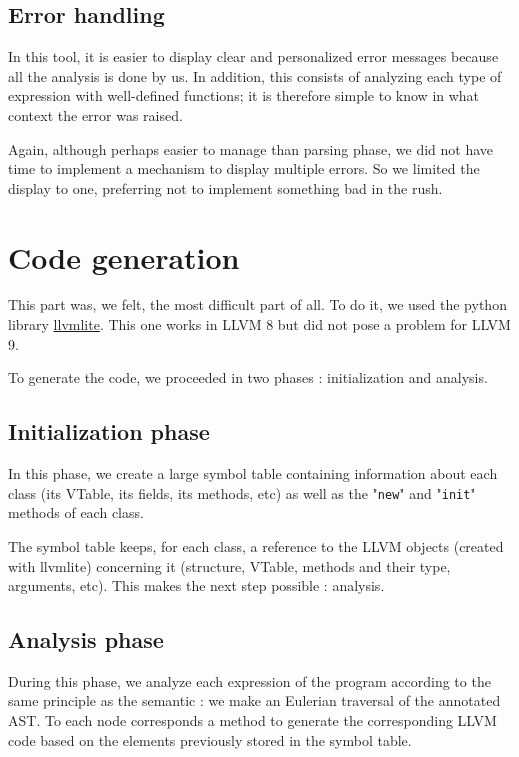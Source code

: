 \documentclass[a4paper, 12pt]{article}
\begin{document}
    \subsection{Error handling}
    
    In this tool, it is easier to display clear and personalized error messages because all the analysis is done by us. In addition, this consists of analyzing each type of expression with well-defined functions; it is therefore simple to know in what context the error was raised.
    
    Again, although perhaps easier to manage than parsing phase, we did not have time to implement a mechanism to display multiple errors. So we limited the display to one, preferring not to implement something bad in the rush.
    
    
    \section{Code generation}
    
    This part was, we felt, the most difficult part of all. To do it, we used the python library \href{https://github.com/numba/llvmlite}{llvmlite}. This one works in LLVM 8 but did not pose a problem for LLVM 9.
    
    To generate the code, we proceeded in two phases : initialization and analysis.
    
    \subsection{Initialization phase}
    
    In this phase, we create a large symbol table containing information about each class (its VTable, its fields, its methods, etc) as well as the "\texttt{new}" and "\texttt{init}" methods of each class.
    
    The symbol table keeps, for each class, a reference to the LLVM objects (created with llvmlite) concerning it (structure, VTable, methods and their type, arguments, etc). This makes the next step possible : analysis.
    
    \subsection{Analysis phase}
    
    During this phase, we analyze each expression of the program according to the same principle as the semantic : we make an Eulerian traversal of the annotated AST. To each node corresponds a method to generate the corresponding LLVM code based on the elements previously stored in the symbol table.
    
\end{document}
